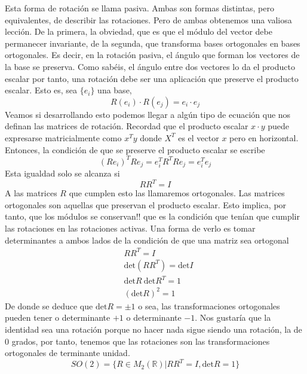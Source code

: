 \documentclass[12pt]{article}
\begin{document}
Esta forma de rotación se llama pasiva. Ambas son formas distintas, pero equivalentes, de describir las rotaciones. Pero de ambas obtenemos una valiosa lección. De la primera, la obviedad, que es que el módulo del vector debe permanecer invariante, de la segunda, que transforma bases ortogonales en bases ortogonales. Es decir, en la rotación pasiva, el ángulo que forman los vectores de la base se preserva. Como sabéis, el ángulo entre dos vectores lo da el producto escalar por tanto, una rotación debe ser una aplicación que preserve el producto escalar. Esto es, sea $\{e_i\}$ una base, 
\begin{equation}
    R(e_i) \cdot R(e_j)=e_i\cdot e_j
\end{equation}
Veamos si desarrollando esto podemos llegar a algún tipo de ecuación que nos definan las matrices de rotación. Recordad que el producto escalar $x\cdot y$ puede expresarse matricialmente como $x^T y$ donde $X^T$ es el vector $x$ pero en horizontal. Entonces, la condición de que se preserve el producto escalar se escribe
$$(R e_i)^T Re_j = e_i^T R^T R e_j = e_i^T e_j$$
Esta igualdad solo se alcanza si
\begin{equation}
    R R^T =I
\end{equation} 
A las matrices $R$ que cumplen esto las llamaremos ortogonales. Las matrices ortogonales son aquellas que preservan el producto escalar. Esto implica, por tanto, que los módulos se conservan!! que es la condición que tenían que cumplir las rotaciones en las rotaciones activas.  Una forma de verlo es tomar determinantes a ambos lados de la condición de que una matriz sea ortogonal 
\begin{equation*}
    \begin{split}
      &  R R^T =I \\
      &  \text{det} (R R^T) = \text{det}I \\
      &  \text{det} R \ \text{det} R^T =1 \\
       & (\text{det} R)^2 =1
\end{split}
\end{equation*}
De donde se deduce que $\text{det} R =\pm 1$ o sea, las transformaciones ortogonales pueden tener o determinante $+1$ o determinante $-1$. Nos gustaría que la identidad sea una rotación porque no hacer nada sigue siendo una rotación, la de $0$ grados, por tanto, tenemos que las rotaciones son las transformaciones ortogonales de terminante unidad. 
\begin{equation}
    SO(2) =\{R\in M_2(\mathbb{R}) | R R^T=I, \text{det}R =1\}
\end{equation}
\end{document}
